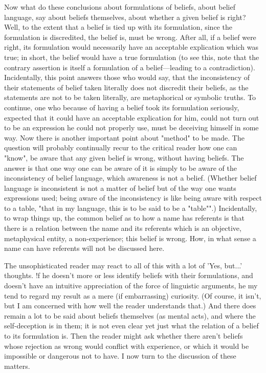 \documentclass[10pt,twoside]{memoir}
\begin{document}
\begin{enumerate}
{Now what do these conclusions about formulations of beliefs, about 
belief language, say about beliefs themselves, about whether a given belief is 
right? Well, to the extent that a belief is tied up with its formulation, since 
the formulation is discredited, the belief is, must be wrong. After all, if a 
belief were right, its formulation would necessarily have an acceptable 
explication which was true; in short, the belief would have a true 
formulation (to see this, note that the contrary assertion is itself a 
formulation of a belief---leading to a contradiction). Incidentally, this point 
answers those who would say, that the inconsistency of their statements of 
belief taken literally does not discredit their beliefs, as the statements are not 
to be taken literally, are metaphorical or symbolic truths. To continue, one 
who because of having a belief took its formulation seriously, expected that 
it could have an acceptable explication for him, could not turn out to be an 
expression he could not properly use, must be deceiving himself in some 
way. Now there is another important point about "method" to be made. 
The question will probably continually recur to the critical reader how one 
can "know", be aware that any given belief is wrong, without having beliefs. 
The answer is that one way one can be aware of it is simply to be aware of 
the inconsistency of belief language, which awareness is not a belief. 
(Whether belief language is inconsistent is not a matter of belief but of the 
way one wants expressions used; being aware of the inconsistency is like 
being aware with respect to a table, "that in my language, this is to be said to 
be a "table"".) Incidentally, to wrap things up, the common belief as to how 
a name has referents is that there is a relation between the name and its 
referents which is an objective, metaphysical entity, a non-experience; this 
belief is wrong. How, in what sense a name can have referents will not be 
discussed here. 

The unsophisticated reader may react to all of this with a lot of 'Yes, 
but...' thoughts. !f he doesn't more or less identify beliefs with their 
formulations, and doesn't have an intuitive appreciation of the force of 
linguistic arguments, he my tend to regard my result as a mere (if 
embarrassing) curiosity. (Of course, it isn't, but I am concerned with how 
well the reader understands that.) And there does remain a lot to be said 
about beliefs themselves (as mental acts), and where the self-deception is in 
them; it is not even clear yet just what the relation of a belief to its 
formulation is. Then the reader might ask whether there aren't beliefs whose 
rejection as wrong would conflict with experience, or which it would be 
impossible or dangerous not to have. I now turn to the discussion of these 
matters. 


}
\end{enumerate}
\end{document}
